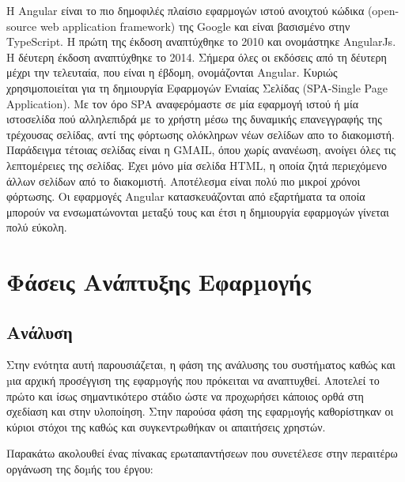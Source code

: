 \documentclass[a4paper,12pt]{article}
\begin{document}
			Η Angular είναι το πιο δημοφιλές πλαίσιο εφαρμογών ιστού ανοιχτού κώδικα (open-source web application framework) της Google και είναι βασισμένο στην TypeScript. Η πρώτη της έκδοση αναπτύχθηκε
			το 2010 και ονομάστηκε AngularJs. Η δέυτερη έκδοση αναπτύχθηκε το 2014. Σήμερα όλες οι εκδόσεις από τη δέυτερη μέχρι την τελευταία, που είναι η έβδομη, ονομάζονται Angular. 
			Κυριώς χρησιμοποιείται για τη δημιουργία Εφαρμογών Ενιαίας Σελίδας (SPA-Single Page Application). Με τον όρο SPA αναφερόμαστε σε μία εφαρμογή ιστού ή μία ιστοσελίδα πού αλληλεπιδρά με το χρήστη μέσω της δυναμικής επανεγγραφής 
			της τρέχουσας σελίδας, αντί της φόρτωσης ολόκληρων νέων σελίδων απο το διακομιστή. Παράδειγμα τέτοιας σελίδας είναι η GMAIL, όπου χωρίς ανανέωση, ανοίγει όλες τις λεπτομέρειες της σελίδας. 
			Έχει μόνο μία σελίδα HTML, η οποία ζητά περιεχόμενο άλλων σελίδων από το διακομιστή. Αποτέλεσμα είναι πολύ πιο μικροί χρόνοι φόρτωσης. Οι εφαρμογές Angular κατασκευάζονται από εξαρτήματα τα οποία
			μπορούν να ενσωματώνονται μεταξύ τους και έτσι η δημιουργία εφαρμογών γίνεται πολύ εύκολη.

		\newpage
		\section{Φάσεις Ανάπτυξης Εφαρµογής}
		
		\subsection{Ανάλυση}

		Στην ενότητα αυτή παρουσιάζεται, η φάση της ανάλυσης του συστήµατος καθώς και
		µια αρχική προσέγγιση της εφαρµογής που πρόκειται να αναπτυχθεί. Αποτελεί το
		πρώτο και ίσως σημαντικότερο στάδιο ώστε να προχωρήσει κάποιος ορθά στη
		σχεδίαση και στην υλοποίηση. Στην παρούσα φάση της εφαρµογής καθορίστηκαν οι κύριοι στόχοι της
		καθώς και συγκεντρωθήκαν οι απαιτήσεις χρηστών.
		
		Παρακάτω ακολουθεί ένας
		πίνακας ερωταπαντήσεων που συνετέλεσε στην περαιτέρω οργάνωση
		της δοµής του έργου:
\end{document}
